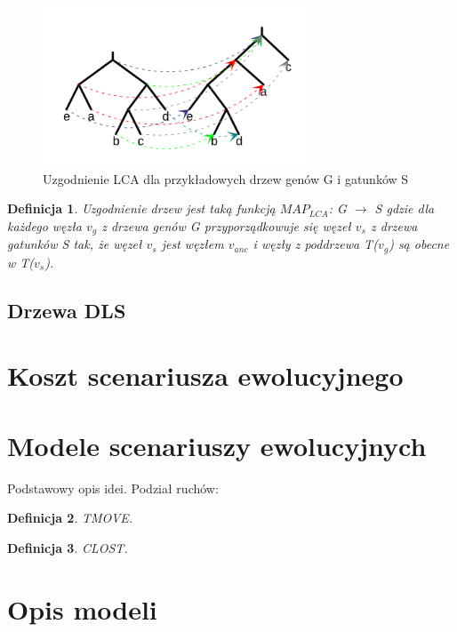 \documentclass[licencjacka]{pracamgr}
\newtheorem{defi}{Definicja}[section]
\begin{document}
\begin{figure}[h]
  \centering
  \includegraphics[width=80mm]{./pictures/mapping.png}
  \caption{Uzgodnienie LCA dla przykładowych drzew genów G i gatunków S \cite{gsevol}}
\end{figure}

\begin{defi}
Uzgodnienie drzew jest taką funkcją $MAP_{LCA}$: G $\rightarrow$ S gdzie dla każdego węzła $v_g$ z drzewa genów G przyporządkowuje się węzeł $v_s$ z drzewa gatunków S tak, że węzeł $v_s$ jest węzłem $v_{anc}$ i węzły z poddrzewa T($v_g$) są obecne w T($v_s$).
\end{defi}


\subsection{Drzewa DLS}



\section{Koszt scenariusza ewolucyjnego}


\section{Modele scenariuszy ewolucyjnych}

Podstawowy opis idei. Podział ruchów:
\\[1in]

\begin{defi}\label{TMOVE}
  TMOVE.\\[1in]
\end{defi}

\begin{defi}\label{CLOST}
  CLOST.\\[1in]
\end{defi}

\section{Opis modeli}
\end{document}
